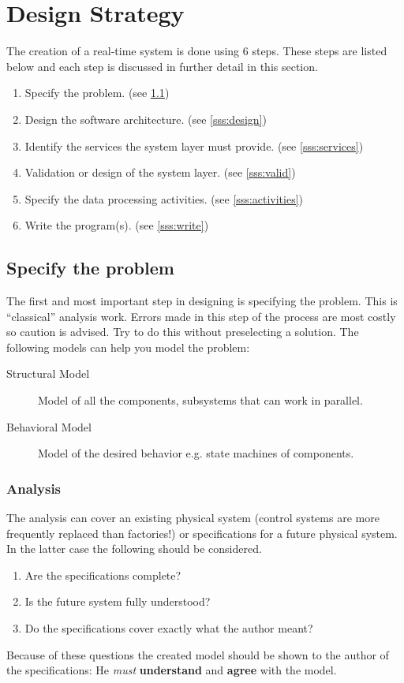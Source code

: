 \documentclass[../main.tex]{subfiles}
\begin{document}
\section{Design Strategy}
The creation of a real-time system is done using 6 steps.
These steps are listed below and each step is discussed in further detail in this section. 
\begin{enumerate}
	\item Specify the problem. (see \ref{sss:specify_problem})
	\item Design the software architecture. (see \ref{sss:design})
	\item Identify the services the  system layer must provide. (see \ref{sss:services})
	\item Validation or design of the system layer. (see \ref{sss:valid})
	\item Specify the data processing activities. (see \ref{sss:activities})
	\item Write the program(s). (see \ref{sss:write})
\end{enumerate}

\subsection{Specify the problem}
\label{sss:specify_problem}
The first and most important step in designing is specifying the problem. This is ``classical'' analysis work.
Errors made in this step of the process are most costly so caution is advised. 
Try to do this without preselecting a solution. The following models can help you model the problem:
\begin{description}
	\item[ Structural Model] Model of all the components, subsystems that can work in parallel.
	\item[ Behavioral Model] Model of the desired behavior e.g. state machines of components. 
\end{description}

\subsubsection{Analysis}
The analysis can cover an existing physical system (control systems are more frequently replaced than factories!) or specifications for a future physical system.
In the latter case the following should be considered.
\begin{enumerate}
	\item Are the specifications complete?
	\item Is the future system fully understood?
	\item Do the specifications cover exactly what the author meant?  
\end{enumerate}
Because of these questions the created model should be shown to the author of the specifications: 
He \textit{must} \textbf{understand} and \textbf{agree} with the model.
\end{document}
